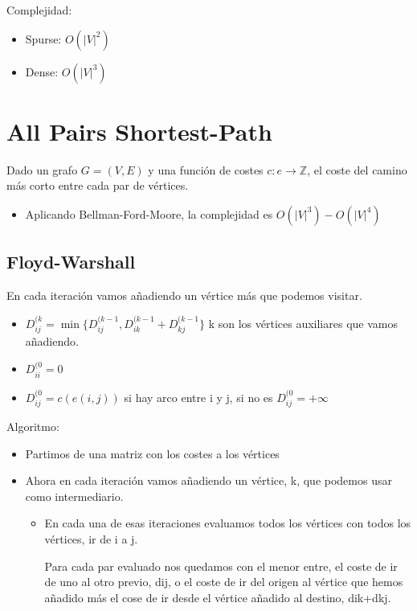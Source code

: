 \documentclass[12pt, twoside, openright]{report} %
\begin{document}
Complejidad:

\begin{itemize}

\item Spurse: \(O(|V|^2)\)
\item Dense: \(O(|V|^3)\)
\end{itemize}


\section{All Pairs Shortest-Path}

Dado un grafo \(G=(V,E)\) y una función de costes \(c: e → \mathbb{Z}\),
el coste del camino más corto entre cada par de vértices.

\begin{itemize}
\item Aplicando Bellman-Ford-Moore, la complejidad es \(O(|V|^3)-O(|V|^4)\)
\end{itemize}

\subsection{Floyd-Warshall}

En cada iteración vamos añadiendo un vértice más que podemos visitar.

\begin{itemize}
	\item $D_{ij}^{(k} = \min \{ D_{ij}^{(k-1}, D_{ik}^{(k-1}+D_{kj}^{(k-1} \}$ k son los vértices auxiliares que vamos añadiendo.
	\item $D_{ii}^{(0} =0$
	\item $D_{ij}^{(0}= c(e(i,j))$ si hay arco entre i y j, si no es $D_{ij}^{(0}= + \infty$
\end{itemize}
     

Algoritmo: 
\begin{itemize}
	\item Partimos de una matriz con los costes a los vértices
	\item Ahora en cada
	iteración vamos añadiendo un vértice, k, que podemos usar como
	intermediario.
	\begin{itemize}
		\item En cada una de esas iteraciones evaluamos todos los
		vértices con todos los vértices, ir de i a j.
		
		Para cada par evaluado
		nos quedamos con el menor entre, el coste de ir de uno al otro previo,
		dij, o el coste de ir del origen al vértice que hemos añadido más el
		cose de ir desde el vértice añadido al destino, dik+dkj.
	\end{itemize}
	
\end{itemize}
\end{document}
